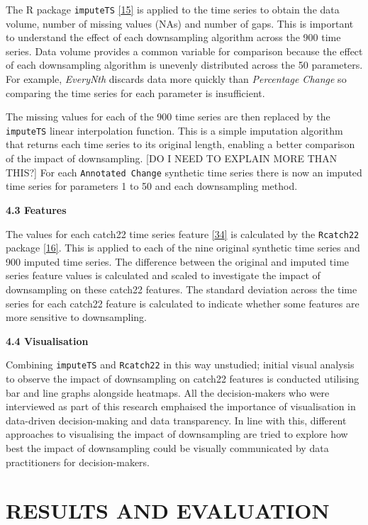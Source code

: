 \documentclass{article}
\begin{document}
The R package \texttt{imputeTS}
\protect\hyperlink{ref-imputeTS_R}{{[}15{]}} is applied to the time
series to obtain the data volume, number of missing values (NAs) and
number of gaps. This is important to understand the effect of each
downsampling algorithm across the 900 time series. Data volume provides
a common variable for comparison because the effect of each downsampling
algorithm is unevenly distributed across the 50 parameters. For example,
\emph{EveryNth} discards data more quickly than \emph{Percentage Change}
so comparing the time series for each parameter is insufficient.

The missing values for each of the 900 time series are then replaced by
the \texttt{imputeTS} linear interpolation function. This is a simple
imputation algorithm that returns each time series to its original
length, enabling a better comparison of the impact of downsampling.
{[}DO I NEED TO EXPLAIN MORE THAN THIS?{]} For each
\texttt{Annotated\ Change} synthetic time series there is now an imputed
time series for parameters 1 to 50 and each downsampling method.

\textbf{4.3 Features}

The values for each catch22 time series feature
\protect\hyperlink{ref-catch22}{{[}34{]}} is calculated by the
\texttt{Rcatch22} package \protect\hyperlink{ref-catch22_R}{{[}16{]}}.
This is applied to each of the nine original synthetic time series and
900 imputed time series. The difference between the original and imputed
time series feature values is calculated and scaled to investigate the
impact of downsampling on these catch22 features. The standard deviation
across the time series for each catch22 feature is calculated to
indicate whether some features are more sensitive to downsampling.

\textbf{4.4 Visualisation}

Combining \texttt{imputeTS} and \texttt{Rcatch22} in this way unstudied;
initial visual analysis to observe the impact of downsampling on catch22
features is conducted utilising bar and line graphs alongside heatmaps.
All the decision-makers who were interviewed as part of this research
emphaised the importance of visualisation in data-driven decision-making
and data transparency. In line with this, different approaches to
visualising the impact of downsampling are tried to explore how best the
impact of downsampling could be visually communicated by data
practitioners for decision-makers.

\hypertarget{results-and-evaluation}{%
\section{RESULTS AND EVALUATION}\label{results-and-evaluation}}
\end{document}
